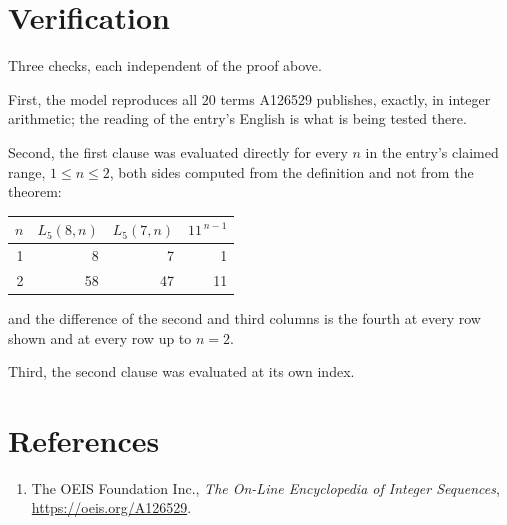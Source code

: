 \documentclass[11pt,a4paper]{article}
\theoremstyle{plain}
\theoremstyle{definition}
\begin{document}
\section{Verification}

Three checks, each independent of the proof above.

First, the model reproduces all $20$ terms A126529 publishes, exactly, in integer
arithmetic; the reading of the entry's English is what is being tested there.

Second, the first clause was evaluated directly for every $n$ in the entry's claimed range,
$1\le n\le2$, both sides computed from the definition and not from the theorem:

\begin{center}
\begin{tabular}{rrrr}
$n$ & $L_{5}(8,n)$ & $L_{5}(7,n)$ & $11^{\,n-1}$ \\ \hline
1 & 8 & 7 & 1 \\
2 & 58 & 47 & 11 \\
\end{tabular}
\end{center}

\noindent and the difference of the second and third columns is the fourth at every row shown
and at every row up to $n=2$.

Third, the second clause was evaluated at its own index.

\section*{References}
\begin{enumerate}
\item The OEIS Foundation Inc., \emph{The On-Line Encyclopedia of Integer Sequences},
\url{https://oeis.org/A126529}.
\end{enumerate}
\end{document}
